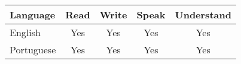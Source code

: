 


\begin{table}[!ht]
	\centering
	\setlength\aboverulesep{0pt}
	\setlength\belowrulesep{0pt}
	\begin{tabular}{|l|c|c|c|c|}
		\toprule 
		\textbf{Language} & \textbf{Read} & \textbf{Write} & \textbf{Speak} & \textbf{Understand} \\ \midrule
		English           &      Yes      &      Yes       &      Yes       &         Yes         \\ \midrule
		Portuguese        &      Yes      &      Yes       &      Yes       &         Yes         \\ \bottomrule
	\end{tabular}
\end{table}